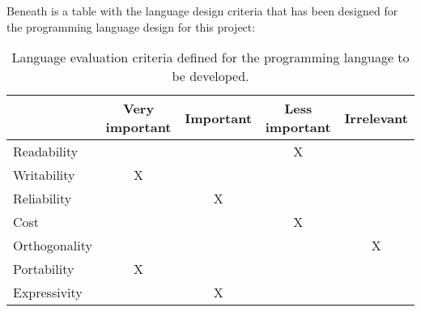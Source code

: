 Beneath is a table with the language design criteria that has been designed for the programming language design for this project:
\begin{table}[htbp]
\centering
\begin{tabular}{|l|c|c|c|c|}
\hline
& Very important & Important & Less important & Irrelevant \\ \hline
Readability & & & X & \\ \hline
Writability & X & & & \\ \hline
Reliability & & X & & \\ \hline
Cost & & & X & \\ \hline
Orthogonality & & & & X \\ \hline
Portability & X & & & \\ \hline
Expressivity & & X & & \\ \hline
\end{tabular}
\caption{Language evaluation criteria defined for the programming language to be developed.}
\label{tbl:evaluation criteria}
\end{table}